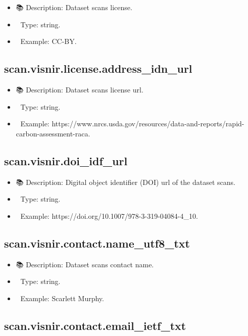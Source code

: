 \documentclass[
  letterpaper,
  DIV=11,
  numbers=noendperiod]{scrreprt}
\providecommand{\tightlist}{%
  \setlength{\itemsep}{0pt}\setlength{\parskip}{0pt}}\usepackage{longtable,booktabs,array}
\begin{document}
\begin{itemize}
\tightlist
\item
  📚 Description: Dataset scans license.
\item
  🔢 Type: string.
\item
  📖 Example: CC-BY.
\end{itemize}

\subsection{scan.visnir.license.address\_idn\_url}\label{scan.visnir.license.address_idn_url}

\begin{itemize}
\tightlist
\item
  📚 Description: Dataset scans license url.
\item
  🔢 Type: string.
\item
  📖 Example:
  https://www.nrcs.usda.gov/resources/data-and-reports/rapid-carbon-assessment-raca.
\end{itemize}

\subsection{scan.visnir.doi\_idf\_url}\label{scan.visnir.doi_idf_url}

\begin{itemize}
\tightlist
\item
  📚 Description: Digital object identifier (DOI) url of the dataset
  scans.
\item
  🔢 Type: string.
\item
  📖 Example: https://doi.org/10.1007/978-3-319-04084-4\_10.
\end{itemize}

\subsection{scan.visnir.contact.name\_utf8\_txt}\label{scan.visnir.contact.name_utf8_txt}

\begin{itemize}
\tightlist
\item
  📚 Description: Dataset scans contact name.
\item
  🔢 Type: string.
\item
  📖 Example: Scarlett Murphy.
\end{itemize}

\subsection{scan.visnir.contact.email\_ietf\_txt}\label{scan.visnir.contact.email_ietf_txt}
\end{document}
